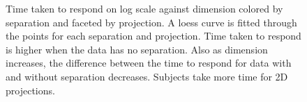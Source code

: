 \begin{figure}[hbtp]
   \centering
      \caption{Time taken to respond on log scale against dimension colored by separation and faceted by projection. A loess curve is fitted through the points for each separation and projection. Time taken to respond is higher when the data has no separation. Also as dimension increases, the difference between the time to respond for data with and without separation decreases. Subjects take more time for 2D projections.  }
       \label{time-taken}
\end{figure}


